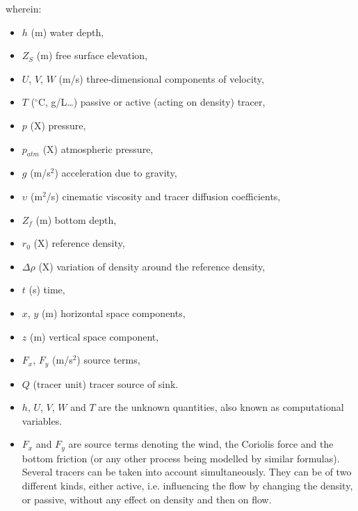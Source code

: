 wherein:
\begin{itemize}
\item $h$ (m) water depth,

\item $Z_{S}$ (m) free surface elevation,

\item $U$, $V$, $W$ (m/s) three-dimensional components of
velocity,

\item $T$ (${}^\circ$C, g/L\dots ) passive or active (acting on density)
tracer,

\item $p$ (X) pressure,

\item $p_{atm}$ (X) atmospheric pressure,

\item $g$ (m/s$^2$) acceleration due to gravity,

\item $\upsilon$ (m$^2$/s) cinematic viscosity and tracer diffusion coefficients,

\item $Z_f$ (m) bottom depth,

\item $r_0$ (X) reference density,

\item $\Delta \rho$ (X) variation of density around the reference density,

\item $t$ (s) time,

\item $x$, $y$ (m) horizontal space components,

\item $z$ (m) vertical space component,

\item $F_{x}$, $F_{y}$ (m/s$^2$) source terms,

\item $Q$ (tracer unit) tracer source of sink.

\item $h$, $U$, $V$, $W$ and $T$ are the unknown
quantities, also known as computational variables.

\item $F_{x}$ and $F_{y}$ are source terms denoting the wind,
the Coriolis force and the bottom friction (or any other process being modelled
by similar formulas). Several tracers can be taken into account simultaneously.
They can be of two different kinds, either active, i.e. influencing the flow by
changing the density, or passive, without any effect on density and then on
flow.
\end{itemize}

